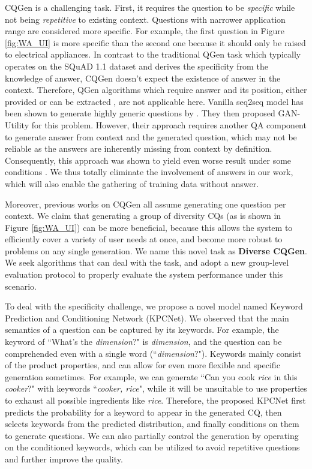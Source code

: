 \documentclass[letterpaper]{article} %
\begin{document}
CQGen is a challenging task. First, it requires the question to be \textit{specific} while not being \textit{repetitive} to existing context. Questions with narrower application range are considered more specific. For example, the first question in Figure \ref{fig:WA_UI} is more specific than the second one because it should only be raised to electrical appliances. In contrast to the traditional QGen task which typically operates on the SQuAD 1.1 dataset \citep{rajpurkar2016squad} and derives the specificity from the knowledge of answer, CQGen doesn't expect the existence of answer in the context. Therefore, QGen algorithms which require answer and its position, either provided \citep{song2018leveraging, sun2018answer} or can be extracted \citep{subramanian2018neural}, are not applicable here. Vanilla seq2seq model has been shown to generate highly generic questions by \citet{rao2019answer}. They then proposed GAN-Utility for this problem. However, their approach requires another QA component to generate answer from context and the generated question, which may not be reliable as the answers are inherently missing from context by definition. Consequently, this approach was shown to yield even worse result under some conditions \citep{cao2019controlling}. We thus totally eliminate the involvement of answers in our work, which will also enable the gathering of training data without answer.

Moreover, previous works on CQGen all assume generating one question per context. We claim that generating a group of diversity CQs (as is shown in Figure \ref{fig:WA_UI}) can be more beneficial, because this allows the system to efficiently cover a variety of user needs at once, and become more robust to problems on any single generation. We name this novel task as \textbf{Diverse CQGen}. We seek algorithms that can deal with the task, and adopt a new group-level evaluation protocol to properly evaluate the system performance under this scenario.

To deal with the specificity challenge, we propose a novel model named Keyword Prediction and Conditioning Network (KPCNet). We observed that the main semantics of a question can be captured by its keywords. For example, the keyword of ``What's the \textit{dimension}?" is \textit{dimension}, and the question can be comprehended even with a single word (``\textit{dimension}?"). Keywords mainly consist of the product properties, and can allow for even more flexible and specific generation sometimes. For example, we can generate ``Can you cook \textit{rice} in this \textit{cooker}?" with keywords ``\textit{cooker, rice}", while it will be unsuitable to use properties to exhaust all possible ingredients like \textit{rice}. Therefore, the proposed KPCNet first predicts the probability for a keyword to appear in the generated CQ, then selects keywords from the predicted distribution, and finally conditions on them to generate questions. We can also partially control the generation by operating on the conditioned keywords, which can be utilized to avoid repetitive questions and further improve the quality.
\end{document}
